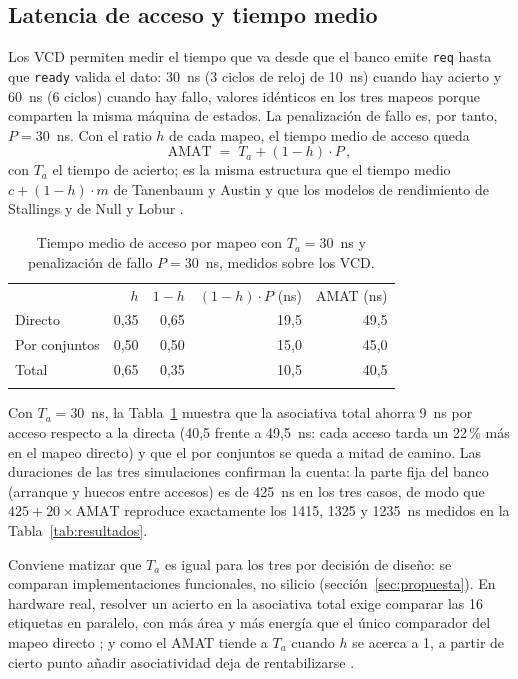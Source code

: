 \documentclass[llncs]{llncs}
\begin{document}
\subsection{Latencia de acceso y tiempo medio}

Los VCD permiten medir el tiempo que va desde que el banco emite
\texttt{req} hasta que \texttt{ready} valida el dato: 30~ns (3 ciclos
de reloj de 10~ns) cuando hay acierto y 60~ns (6 ciclos) cuando hay
fallo, valores idénticos en los tres mapeos porque comparten la misma
máquina de estados. La penalización de fallo es, por tanto,
$P = 30$~ns. Con el ratio $h$ de cada mapeo, el tiempo medio de acceso
queda
\[
  \mathrm{AMAT} \;=\; T_a + (1-h)\cdot P \,,
\]
con $T_a$ el tiempo de acierto; es la misma estructura que el tiempo
medio $c + (1-h)\cdot m$ de Tanenbaum y Austin \cite{tanenbaum2013} y
que los modelos de rendimiento de Stallings \cite{stallings2019} y de
Null y Lobur \cite{null2024}.

\begin{table}[t]
\centering
\small
\begin{tabular}{@{}lrrrr@{}}
\hline
\noalign{\smallskip}
 & $h$ & $1-h$ & $(1-h)\cdot P$ (ns) & AMAT (ns) \\
\noalign{\smallskip}\hline\noalign{\smallskip}
Directo & 0,35 & 0,65 & 19,5 & 49,5 \\
Por conjuntos & 0,50 & 0,50 & 15,0 & 45,0 \\
Total & 0,65 & 0,35 & 10,5 & 40,5 \\
\noalign{\smallskip}\hline
\end{tabular}
\caption{Tiempo medio de acceso por mapeo con $T_a = 30$~ns y
penalización de fallo $P = 30$~ns, medidos sobre los VCD.}
\label{tab:amat}
\end{table}

Con $T_a = 30$~ns, la Tabla~\ref{tab:amat} muestra que la asociativa
total ahorra 9~ns por acceso respecto a la directa (40,5 frente a
49,5~ns: cada acceso tarda un 22\,\% más en el mapeo directo) y que el
por conjuntos se queda a mitad de camino. Las duraciones de las tres
simulaciones confirman la cuenta: la parte fija del banco (arranque y
huecos entre accesos) es de 425~ns en los tres casos, de modo que
$425 + 20 \times \mathrm{AMAT}$ reproduce exactamente los 1415, 1325 y
1235~ns medidos en la Tabla~\ref{tab:resultados}.

Conviene matizar que $T_a$ es igual para los tres por decisión de
diseño: se comparan implementaciones funcionales, no silicio
(sección~\ref{sec:propuesta}). En hardware real, resolver un acierto
en la asociativa total exige comparar las 16 etiquetas en paralelo, con
más área y más energía que el único comparador del mapeo directo
\cite{hennessy2019,wikipedia-cpu-cache}; y como el AMAT tiende a $T_a$
cuando $h$ se acerca a 1, a partir de cierto punto añadir
asociatividad deja de rentabilizarse \cite{hennessy2019}.
\end{document}
